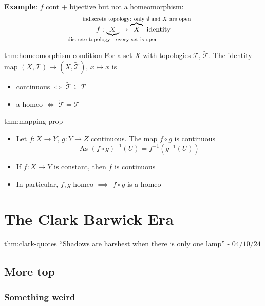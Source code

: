 \documentclass{article}
\begin{document}
\textbf{Example}: $f$ cont + bijective but not a homeomorphism:
\[f : \underbrace{X}_{\mathclap{\text{discrete topology - every set is open}}} \to \overbrace{X}^{\mathclap{\text{indiscrete topology: only $\emptyset$ and $X$ are open}}} \text{ identity}\]

\begin{lma}{thm:homeomorphism-condition}{}
    For a set $X$ with topologies $\mathcal{T},\,\tilde{\mathcal{T}}$. The identity map $(X, \mathcal{T})\to (X, \tilde{\mathcal{T}}),\,x \mapsto x$ is
    \begin{itemize}
        \item continuous $\iff$ $\tilde{\mathcal{T}} \subseteq T$
        \item a homeo $\iff$ $\tilde{\mathcal{T}} = \mathcal{T}$
    \end{itemize}
\end{lma}

\begin{thm}{thm:mapping-prop}{}
    \begin{itemize}
        \item Let $f : X \to Y,\,g : Y \to Z$ continuous. The map $f \circ g$ is continuous
            \[\text{As } (f \circ g)^{-1}(U) = f^{-1}(g^{-1}(U))\]
        \item If $f : X \to Y$ is constant, then $f$ is continuous
        \item In particular, $f, g$ homeo $\implies$ $f \circ g$ is a homeo
    \end{itemize}
\end{thm}

\newpage

\section{The Clark Barwick Era}

\begin{thm}{thm:clark-quotes}{}
    ``Shadows are harshest when there is only one lamp'' - $04 /10 /24$
\end{thm}

\subsection{More top}
\subsubsection{Something weird}
\end{document}
